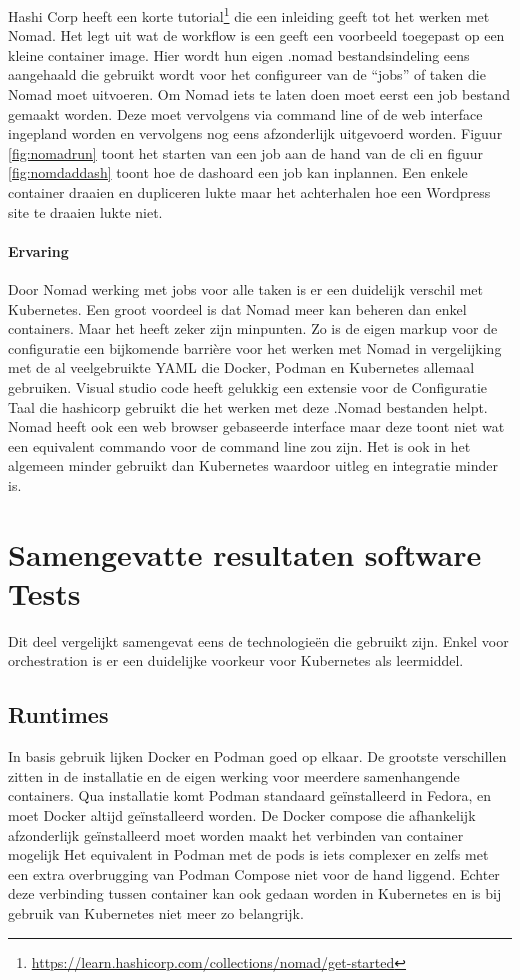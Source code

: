 Hashi Corp heeft een korte tutorial\footnote{\url{https://learn.hashicorp.com/collections/nomad/get-started}} die een inleiding geeft tot het werken met Nomad. Het legt uit wat de workflow is een geeft een voorbeeld toegepast op een kleine container image.  Hier wordt hun eigen .nomad bestandsindeling eens aangehaald die gebruikt wordt voor het configureer van de “jobs” of taken die Nomad moet uitvoeren. Om Nomad iets te laten doen moet eerst een job bestand gemaakt worden. Deze moet vervolgens via command line of de web interface ingepland worden en vervolgens nog eens afzonderlijk uitgevoerd worden. Figuur \ref{fig:nomadrun} toont het starten van een job aan de hand van de cli en figuur \ref{fig:nomdaddash} toont hoe de dashoard een job kan inplannen. Een enkele container draaien en dupliceren lukte maar het achterhalen hoe een Wordpress site te draaien lukte niet.

\paragraph{Ervaring}
Door Nomad werking met jobs voor alle taken is er een duidelijk verschil met Kubernetes. Een groot voordeel is dat Nomad meer kan beheren dan enkel containers. Maar het heeft zeker zijn minpunten. Zo is de eigen markup voor de configuratie een bijkomende barrière voor het werken met Nomad in vergelijking met de al veelgebruikte YAML die Docker, Podman en Kubernetes allemaal gebruiken.  Visual studio code heeft gelukkig een extensie voor de Configuratie Taal die hashicorp gebruikt die het werken met deze .Nomad  bestanden helpt. Nomad heeft ook een web browser gebaseerde interface maar deze toont niet wat een equivalent commando voor de command line zou zijn. Het is ook in het algemeen minder gebruikt dan Kubernetes waardoor uitleg en integratie minder is.  

\section{Samengevatte resultaten software Tests}
Dit deel vergelijkt samengevat eens de technologieën die gebruikt zijn. Enkel voor orchestration is er een duidelijke voorkeur voor Kubernetes als leermiddel.

\subsection{Runtimes}

In basis gebruik lijken Docker en Podman goed op elkaar. De grootste verschillen zitten in de installatie en de eigen werking voor meerdere samenhangende containers. Qua installatie komt Podman standaard geïnstalleerd in Fedora, en moet Docker altijd geïnstalleerd worden. De Docker compose die afhankelijk afzonderlijk geïnstalleerd moet worden maakt het verbinden van container mogelijk  Het equivalent in Podman met de pods is iets complexer en zelfs met een extra overbrugging van Podman Compose niet voor de hand liggend. Echter deze verbinding tussen container kan ook gedaan worden in Kubernetes en is bij gebruik van Kubernetes niet meer zo belangrijk.

